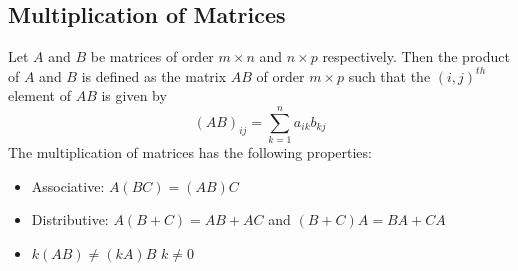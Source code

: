 \documentclass{report}
\begin{document}
\begin{multicols}{2}
    \section{Multiplication of Matrices}
    Let $A$ and $B$ be matrices of order $m \times n$ and $n \times p$
    respectively. Then the product of $A$ and $B$ is defined as the matrix $AB$ of
    order $m \times p$ such that the $(i,j)^{th}$ element of $AB$ is given by
    \begin{equation*}
        (AB)_{ij} = \sum_{k=1}^n a_{ik}b_{kj}
    \end{equation*}
    The multiplication of matrices has the following properties:
    \begin{itemize}
        \item Associative: $A(BC) = (AB)C$
        \item Distributive: $A(B+C) = AB + AC$ and $(B+C)A = BA + CA$
        \item $k(AB) \neq (kA)B$  $k \neq 0$
    \end{itemize}

\end{multicols}
\end{document}
